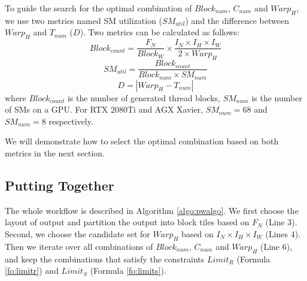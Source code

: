 To guide the search for the optimal combination of $Block_{num}$, $C_{num}$ and $Warp_H$, we use two metrics named SM utilization ($SM_{util}$) and the difference between $Warp_H$ and $T_{num}$ ($D$).
Two metrics can be calculated as follows:
\begin{equation}\nonumber
    Block_{count}=\frac{F_N}{Block_W} \times \frac{I_N \times I_H \times I_W}{2 \times Warp_H}
\end{equation}
\begin{equation}
    SM_{util}=\frac{Block_{count}}{Block_{num}\times SM_{num}}
    \label{fo:smutil}
\end{equation}
\begin{equation}
    D = |Warp_H-T_{num}|
    \label{fo:diff}
\end{equation}
where $Block_{count}$ is the number of generated thread blocks, $SM_{num}$ is the number of SMs on a GPU. For RTX 2080Ti and AGX Xavier, $SM_{num}=68$ and $SM_{num}=8$ respectively.

We will demonstrate how to select the optimal combination based on both metrics in the next section.

\subsection{Putting Together}
The whole workflow is described in Algorithm \ref{algo:pwalgo}.
We first choose the layout of output and partition the output into block tiles based on $F_N$ (Line 3).
Second, we choose the candidate set for $Warp_H$ based on $I_N \times I_H \times I_W$ (Lines 4).
Then we iterate over all combinations of $Block_{num}$, $C_{num}$ and $Warp_H$ (Line 6), and keep the combinations that satisfy the constraints $Limit_R$ (Formula \ref{fo:limitr}) and $Limit_S$ (Formula \ref{fo:limits}).

